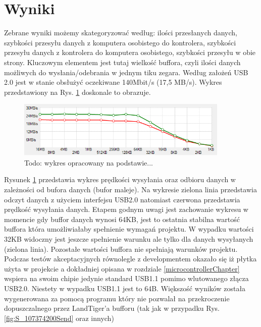 \documentclass{BscUS}
\begin{document}
\section{Wyniki}
\indent Zebrane wyniki możemy skategoryzować według: ilości przesłanych danych, szybkości przesyłu danych z komputera osobistego do kontrolera, szybkości przesyłu danych z kontrolera do komputera osobistego, szybkości przesyłu w obie strony. Kluczowym elementem jest tutaj wielkość buffora, czyli ilości danych możliwych do wysłania/odebrania w jednym tiku zegara.
\newline
\indent Według założeń USB 2.0 jest w stanie obsłużyć oczekiwane 140Mbit/s (17,5 MB/s). Wykres przedstawiony na Rys. \ref{fig:speedTest} doskonale to obrazuje.
\begin{figure}[H]
\centering
\includegraphics[width=0.9\textwidth]{./img/speedTest}
\caption{Todo: wykres opracowany na podstawie...}
\label{fig:speedTest}
\end{figure}
Rysunek \ref{fig:speedTest} przedstawia wykres prędkości wysyłania oraz odbioru danych w zależności od bufora danych (bufor maleje). Na wykresie zielona linia przedstawia odczyt danych z użyciem interfejsu USB2.0 natomiast czerwona przedstawia prędkość wysyłania danych. Etapem godnym uwagi jest zachowanie wykresu w momencie gdy buffor danych wynosi 64KB, jest to ostatnia stabilna wartość buffora która umożliwiałaby spełnienie wymagań projektu. W wypadku wartości 32KB widoczny jest jeszcze spełnienie warunku ale tylko dla danych wysyłanych (zielona linia). Pozostałe wartości buffora nie spełniają warunków projektu.
\newline
\indent Podczas testów akceptacyjnych równolegle z developmentem okazało się iż płytka użyta w projekcie a dokładniej opisana w rozdziale \ref{microcontrollerChapter} wspiera na swoim chipie jedynie standard USB1.1 pomimo wlutowanego złącza USB2.0. Niestety w wypadku USB1.1 jest to 64B. Większość wyników została wygenerowana za pomocą programu który nie pozwalał na przekroczenie dopuszczalnego przez LandTiger'a bufforu (tak jak w przypadku Rys. \ref{fig:S_107374200Send} oraz innych)
\newline
\end{document}
